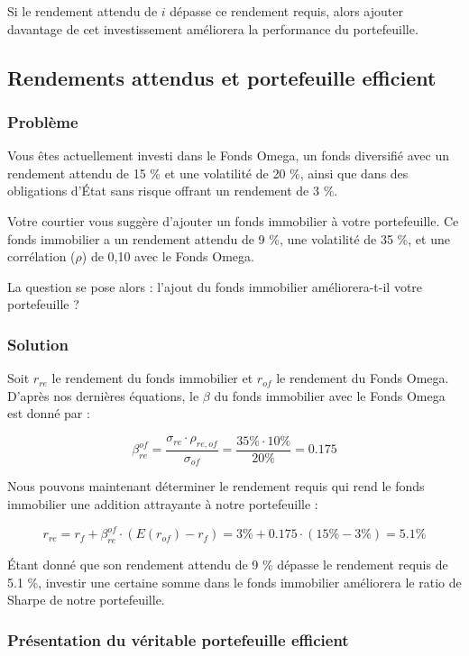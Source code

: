 \documentclass[a4paper, 12pt]{report}
\begin{document}
Si le rendement attendu de \( i \) dépasse ce rendement requis, alors ajouter davantage de cet investissement améliorera la performance du portefeuille.

\subsection{Rendements attendus et portefeuille efficient}

\subsubsection{Problème}

Vous êtes actuellement investi dans le Fonds Omega, un fonds diversifié avec un rendement attendu de 15 \% et une volatilité de 20 \%, ainsi que dans des obligations d'État sans risque offrant un rendement de 3 \%. 

Votre courtier vous suggère d'ajouter un fonds immobilier à votre portefeuille. Ce fonds immobilier a un rendement attendu de 9 \%, une volatilité de 35 \%, et une corrélation (\( \rho \)) de 0,10 avec le Fonds Omega.

La question se pose alors : l'ajout du fonds immobilier améliorera-t-il votre portefeuille ?

\subsubsection{Solution}

Soit \( r_{re} \) le rendement du fonds immobilier et \( r_{of} \) le rendement du Fonds Omega. D'après nos dernières équations, le \(\beta\) du fonds immobilier avec le Fonds Omega est donné par :

\[
\beta^{of}_{re} = \frac{\sigma_{re} \cdot \rho_{re,of}}{\sigma_{of}} = \frac{35\% \cdot 10\%}{20\%} = 0.175
\]

Nous pouvons maintenant déterminer le rendement requis qui rend le fonds immobilier une addition attrayante à notre portefeuille :

\[
r_{re} = r_f + \beta^{of}_{re} \cdot (E(r_{of}) - r_f) = 3\% + 0.175 \cdot (15\% - 3\%) = 5.1\%
\]

Étant donné que son rendement attendu de 9 \% dépasse le rendement requis de 5.1 \%, investir une certaine somme dans le fonds immobilier améliorera le ratio de Sharpe de notre portefeuille.

\subsubsection{Présentation du véritable portefeuille efficient}
\end{document}
